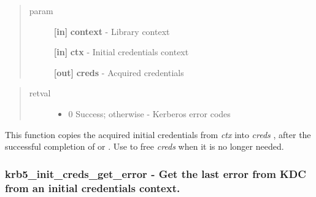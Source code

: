 \documentclass[letterpaper,10pt,english]{sphinxmanual}
\begin{document}
\begin{quote}\begin{description}
\item[{param}] \leavevmode
\textbf{{[}in{]}} \textbf{context} - Library context

\textbf{{[}in{]}} \textbf{ctx} - Initial credentials context

\textbf{{[}out{]}} \textbf{creds} - Acquired credentials

\end{description}\end{quote}
\begin{quote}\begin{description}
\item[{retval}] \leavevmode\begin{itemize}
\item {} 
0   Success; otherwise - Kerberos error codes

\end{itemize}

\end{description}\end{quote}

This function copies the acquired initial credentials from \emph{ctx} into \emph{creds} , after the successful completion of {\hyperref[appdev/refs/api/krb5_init_creds_get:c.krb5_init_creds_get]{}} or {\hyperref[appdev/refs/api/krb5_init_creds_step:c.krb5_init_creds_step]{}} . Use {\hyperref[appdev/refs/api/krb5_free_cred_contents:c.krb5_free_cred_contents]{}} to free \emph{creds} when it is no longer needed.


\subsubsection{krb5\_init\_creds\_get\_error -  Get the last error from KDC from an initial credentials context.}
\label{appdev/refs/api/krb5_init_creds_get_error:krb5-init-creds-get-error-get-the-last-error-from-kdc-from-an-initial-credentials-context}\label{appdev/refs/api/krb5_init_creds_get_error::doc}

\begin{fulllineitems}
\label{appdev/refs/api/krb5_init_creds_get_error:c.krb5_init_creds_get_error}
\end{fulllineitems}
\end{document}
